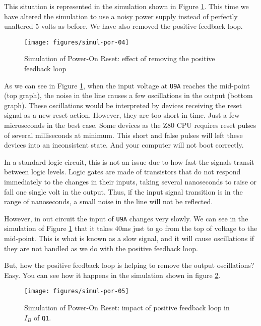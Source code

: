 This situation is represented in the simulation shown in Figure \ref{fig:simul-por-04}. This time we have altered the simulation to use a noisy power supply instead of perfectly unaltered 5 volts as before. We have also removed the positive feedback loop.

\begin{figure}[htb]
  \centering
  \texttt{[image: figures/simul-por-04]}
  \caption{Simulation of Power-On Reset: effect of removing the positive feedback loop}
  \label{fig:simul-por-04}
\end{figure}

As we can see in Figure \ref{fig:simul-por-04}, when the input voltage at {\tt U9A} reaches the mid-point (top graph), the noise in the line causes a few oscillations in the output (bottom graph). These oscillations would be interpreted by devices receiving the reset signal as a new reset action. However, they are too short in time. Just a few microseconds in the best case. Some devices as the Z80 CPU requires reset pulses of several milliseconds at minimum. This short and false pulses will left these devices into an inconsistent state. And your computer will not boot correctly.

In a standard logic circuit, this is not an issue due to how fast the signals transit between logic levels. Logic gates are made of transistors that do not respond immediately to the changes in their inputs, taking several nanoseconds to raise or fall one single volt in the output. Thus, if the input signal transition is in the range of nanoseconds, a small noise in the line will not be reflected.

However, in out circuit the input of {\tt U9A} changes very slowly. We can see in the simulation of Figure \ref{fig:simul-por-04} that it takes 40ms just to go from the top of voltage to the mid-point. This is what is known as a slow signal, and it will cause oscillations if they are not handled as we do with the positive feedback loop.

But, how the positive feedback loop is helping to remove the output oscillations? Easy. You can see how it happens in the simulation shown in figure \ref{fig:simul-por-05}.

\begin{figure}[htb]
  \centering
  \texttt{[image: figures/simul-por-05]}
  \caption{Simulation of Power-On Reset: impact of positive feedback loop in $I_B$ of {\tt Q1}.}
  \label{fig:simul-por-05}
\end{figure}

